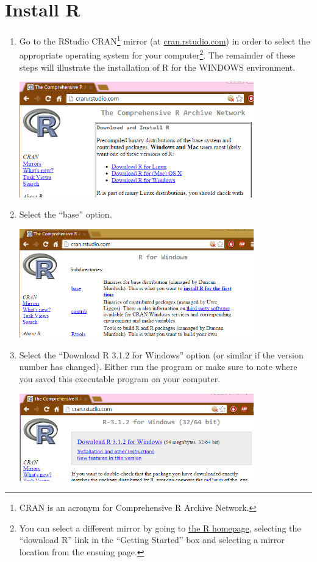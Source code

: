 \documentclass{article}\usepackage[]{graphicx}\usepackage[]{color}
\begin{document}
\section{Install R}
\begin{enumerate}
  \item Go to the RStudio CRAN\footnote{CRAN is an acronym for Comprehensive R Archive Network.} mirror (at \href{http://cran.rstudio.com/}{cran.rstudio.com}) in order to select the appropriate operating system for your computer\footnote{You can select a different mirror by going to \href{http://www.r-project.org/}{the R homepage}, selecting the ``download R'' link in the ``Getting Started'' box and selecting a mirror location from the ensuing page.}.  The remainder of these steps will illustrate the installation of R for the WINDOWS environment.
\begin{center}
  \includegraphics[width=4in]{Figs/R_Install_ChooseOS.png}
\end{center}

  \item Select the ``base'' option.
\begin{center}
  \includegraphics[width=4in]{Figs/R_Install_ChooseBase.png}
\end{center}

  \item Select the ``Download R 3.1.2 for Windows'' option (or similar if the version number has changed).  Either run the program or make sure to note where you saved this executable program on your computer.
\begin{center}
  \includegraphics[width=4in]{Figs/R_Install_Download.png}
\end{center}


\end{enumerate}
\end{document}
